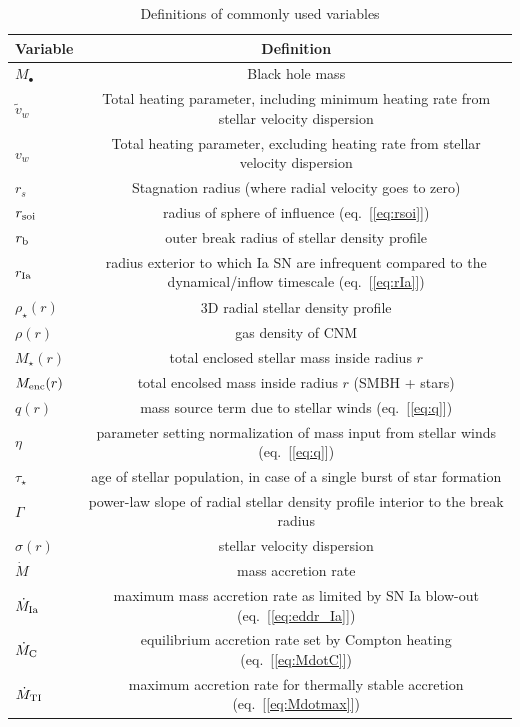 \documentclass[usenatbib,fleqn]{mn2e}
\begin{document}
\begin{table}
\begin{threeparttable}
\begin{minipage}{18cm}
\caption{Definitions of commonly used variables}
\begin{tabular}{lc}
\hline
{Variable} & {Definition} \\
\hline
$M_{\bullet}$ & Black hole mass \\
$\tilde{v}_{w}$ & Total heating parameter, including minimum heating rate from stellar velocity dispersion \\
$v_{w}$ & Total heating parameter, excluding heating rate from stellar velocity dispersion \\
$r_{s}$ & Stagnation radius (where radial velocity goes to zero) \\
$r_{\rm soi}$ & radius of sphere of influence (eq.~[\ref{eq:rsoi}]) \\
$r_{\rm b}$ & outer break radius of stellar density profile \\ 
$r_{\rm Ia}$ & radius exterior to which Ia SN are infrequent compared to the dynamical/inflow timescale (eq.~[\ref{eq:rIa}]) \\ 
$\rho_{\star}(r)$ & 3D radial stellar density profile \\
$\rho(r)$ & gas density of CNM \\
$M_{\star}(r)$ & total enclosed stellar mass inside radius $r$ \\
$M_{\rm enc}(r)$ & total encolsed mass inside radius $r$ (SMBH + stars) \\
$q(r)$ & mass source term due to stellar winds (eq.~[\ref{eq:q}]) \\
$\eta$ & parameter setting normalization of mass input from stellar winds (eq.~[\ref{eq:q}]) \\
$\tau_{\star}$ & age of stellar population, in case of a single burst of star formation \\
$\Gamma$ & power-law slope of radial stellar density profile interior to the break radius \\
$\sigma(r)$ & stellar velocity dispersion \\
$\dot{M}$ & mass accretion rate \\
$\dot{M}_{\rm Ia}$ & maximum mass accretion rate as limited by SN Ia blow-out (eq.~[\ref{eq:eddr_Ia}]) \\
$\dot{M}_{\rm C}$ & equilibrium accretion rate set by Compton heating (eq.~[\ref{eq:MdotC}]) \\
$\dot{M}_{\rm TI}$ & maximum accretion rate for thermally stable accretion (eq.~[\ref{eq:Mdotmax}]) \\

\end{tabular}
\end{minipage}
\end{threeparttable}
\end{table}
\end{document}
